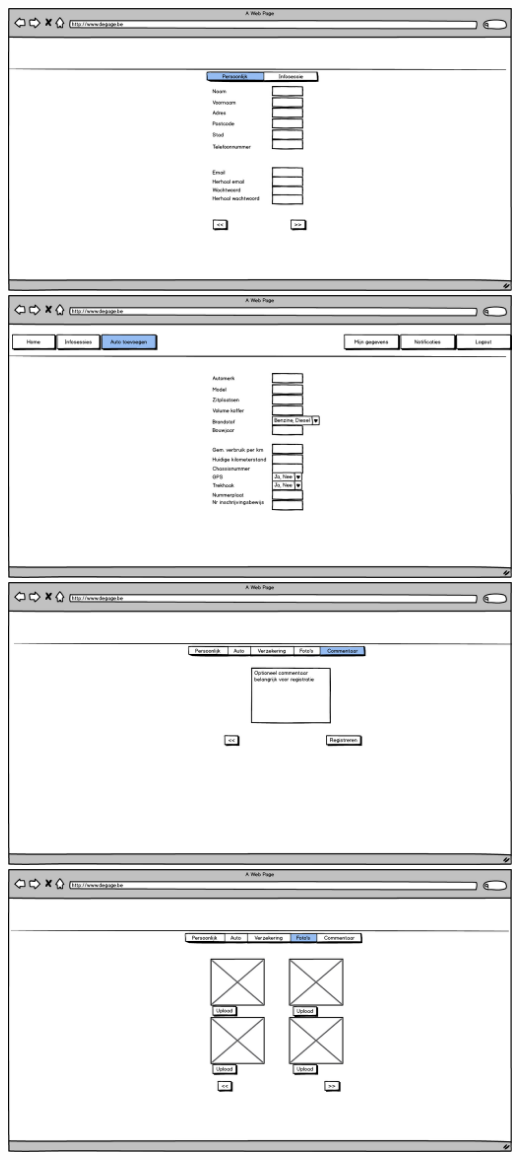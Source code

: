 \documentclass[]{article}
\begin{document}
\includegraphics[scale=0.4]{mockups/registratie_autolener_persoonlijk.png}
\includegraphics[scale=0.4]{mockups/registratie_eigenaar_auto.png}
\includegraphics[scale=0.4]{mockups/registratie_eigenaar_commentaar.png}
\includegraphics[scale=0.4]{mockups/registratie_eigenaar_fotos.png}
\end{document}
